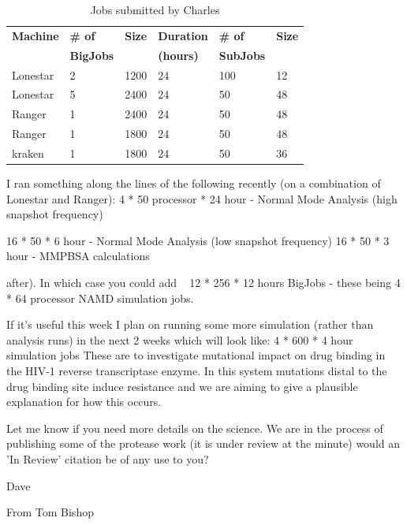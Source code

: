 \documentclass{sig-alternate}
\begin{document}
\begin{table}[h]
\begin{center}
\begin{tabular}{p{1.1cm}p{1.2cm}p{0.8cm}p{1.2cm}p{1.1cm}p{0.8cm}}
\toprule
\textbf{Machine}  & 
\textbf{\# of}    &
\textbf{Size}     & 
\textbf{Duration} & 
\textbf{\# of}    &
\textbf{Size}     \\
                  &
\textbf{BigJobs}  &
                  &
\textbf{(hours)}  &
\textbf{SubJobs}  &
                  \\ \midrule
Lonestar & 2 & 1200 & 24 & 100 & 12 \\ \midrule
Lonestar & 5 & 2400 & 24 &  50 & 48 \\ \midrule
Ranger   & 1 & 2400 & 24 &  50 & 48 \\ \midrule
Ranger   & 1 & 1800 & 24 &  50 & 48 \\ \midrule
kraken   & 1 & 1800 & 24 &  50 & 36 \\ \bottomrule
\end{tabular}
\caption{Jobs submitted by Charles}
\end{center}
\end{table}




I ran something along the lines of the following recently (on a combination of Lonestar and Ranger):
4 * 50 processor * 24 hour - Normal Mode Analysis (high snapshot frequency)

16 * 50 * 6 hour - Normal Mode Analysis (low snapshot frequency)
16 * 50 * 3 hour - MMPBSA calculations

after). In which case you could add ~ 12 * 256 * 12 hours BigJobs - these being 4 * 64 processor NAMD simulation jobs.

If it's useful this week I plan on running some more simulation (rather than analysis runs) in the next 2 weeks which will look like:
4 * 600 * 4 hour simulation jobs
These are to investigate mutational impact on drug binding in the HIV-1 reverse transcriptase enzyme. In this system mutations distal to the drug binding site induce resistance and we are aiming to give a plausible explanation for how this occurs.

Let me know if you need more details on the science. We are in the process of publishing some of the protease work (it is under review at the minute) would an 'In Review' citation be of any use to you?

Dave


From Tom Bishop
\end{document}
